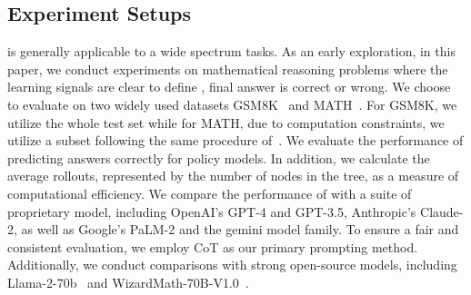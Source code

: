 


\subsection{Experiment Setups}

\model{} is generally applicable to a wide spectrum tasks. As an early exploration, in this paper, we conduct experiments on mathematical reasoning problems where the learning signals are clear to define \ie, final answer is correct or wrong. We choose to evaluate on two widely used datasets GSM8K~\citep{gsm8k} and MATH~\citep{math}. For GSM8K, we utilize the whole test set while for MATH, due to computation constraints, we utilize a subset following the same procedure of~\cite{lightman2023let}. We evaluate the performance of predicting answers correctly for policy models. In addition, we calculate the average rollouts, represented by the number of nodes in the tree, as a measure of computational efficiency. We compare the performance of \model{} with a suite of proprietary model, including OpenAI's GPT-4 and GPT-3.5, Anthropic's Claude-2, as well as Google's PaLM-2 and the gemini model family. To ensure a fair and consistent evaluation, we employ CoT as our primary prompting method. Additionally, we conduct comparisons with strong open-source models, including Llama-2-70b~\citep{llama2} and WizardMath-70B-V1.0~\citep{wizardmath}. %


